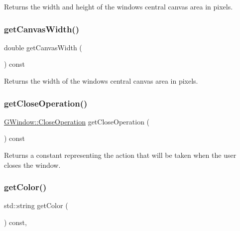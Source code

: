 Returns the width and height of the window\textquotesingle{}s central canvas area in pixels. 

\mbox{\label{classsgl_1_1GWindow_a82ed6884fd4b0257a825e786236c2428}} 
\subsubsection{\texorpdfstring{get\+Canvas\+Width()}{getCanvasWidth()}}
{\footnotesize\ttfamily double get\+Canvas\+Width (\begin{DoxyParamCaption}{ }\end{DoxyParamCaption}) const\hspace{0.3cm}{\ttfamily [virtual]}}



Returns the width of the window\textquotesingle{}s central canvas area in pixels. 

\mbox{\label{classsgl_1_1GWindow_a733b18ceeceb7ab98da8c4ac9a8d2857}} 
\subsubsection{\texorpdfstring{get\+Close\+Operation()}{getCloseOperation()}}
{\footnotesize\ttfamily \mbox{\hyperlink{classsgl_1_1GWindow_a84803201f0f9569db61f51cac9e0d2d2}{G\+Window\+::\+Close\+Operation}} get\+Close\+Operation (\begin{DoxyParamCaption}{ }\end{DoxyParamCaption}) const\hspace{0.3cm}{\ttfamily [virtual]}}



Returns a constant representing the action that will be taken when the user closes the window. 

\mbox{\label{classsgl_1_1GDrawingSurface_aa061dfa488c31e18549d64363c1d0e34}} 
\subsubsection{\texorpdfstring{get\+Color()}{getColor()}}
{\footnotesize\ttfamily std\+::string get\+Color (\begin{DoxyParamCaption}{ }\end{DoxyParamCaption}) const\hspace{0.3cm}{\ttfamily [virtual]}, {\ttfamily [inherited]}}



